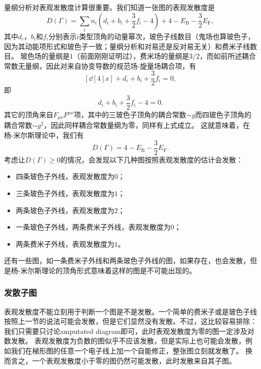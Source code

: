 \documentclass[hyperref, UTF8, a4paper]{ctexart}
\begin{document}
量纲分析对表观发散度计算很重要。我们知道一张图的表观发散度是
\begin{equation}
    D(\Gamma) = \sum_i n_i \left( d_i + b_i + \frac{3}{2} f_i - 4  \right) + 4 - E_\text{B} - \frac{3}{2} E_\text{F},
\end{equation}
其中$d_i$，$b_i$和$f_i$分别表示$i$类型顶角的动量幂次，玻色子线数目（鬼场也算玻色子，因为其动能项形式和玻色子一致；量纲分析和对易还是反对易无关）和费米子线数目。
玻色场的量纲是$1$（前面刚刚证明过），费米场的量纲是$3/2$，而如前所述耦合常数无量纲，因此对来自协变导数的规范场-旋量场耦合项，有
\[
    [\dd[4]{x}] + d_i + b_i + \frac{3}{2} f_i = 0,
\]
即
\[
    d_i + b_i + \frac{3}{2} f_i - 4 = 0.
\]
其它的顶角来自$F_{\mu \nu} F^{\mu \nu}$项，其中的三玻色子顶角的耦合常数$\sim g$而四玻色子顶角的耦合常数$\sim g^2$，因此同样耦合常数量纲为零，同样有上式成立。
这就意味着，在杨-米尔斯理论中，我们有
\begin{equation}
    D(\Gamma) = 4 - E_\text{B} - \frac{3}{2} E_\text{F}.
\end{equation}
考虑让$D(\Gamma) \geq 0$的情况，会发现以下几种图按照表观发散度的估计会发散：
\begin{itemize}
    \item 四条玻色子外线，表观发散度为$0$；
    \item 三条玻色子外线，表观发散度为$1$；
    \item 两条玻色子外线，表观发散度为$2$；
    \item 一条玻色子外线，两条费米子外线，表观发散度为$0$；
    \item 两条费米子外线，表观发散度为$1$。
\end{itemize}
还有一些图，如一条费米子外线和两条玻色子外线的图，如果存在，也会发散，但是杨-米尔斯理论的顶角形式意味着这样的图是不可能出现的。

\subsubsection{发散子图}

表观发散度不能立刻用于判断一个图是不是发散。一个简单的费米子或是玻色子线按照上一节的说法可能会发散，但是它们显然没有发散。不过，这比较容易排除：我们只需要只讨论amputated diagram即可，此时表观发散度为零的图一定涉及对数发散。
表观发散度为负数的图似乎不应该发散，但是实际上也可能会发散，例如我们在梯形图的任意一个电子线上加一个自能修正，整张图立刻就发散了。
换而言之，一个表观发散度小于零的图仍然可能发散，此时发散来自其子图。
\end{document}
